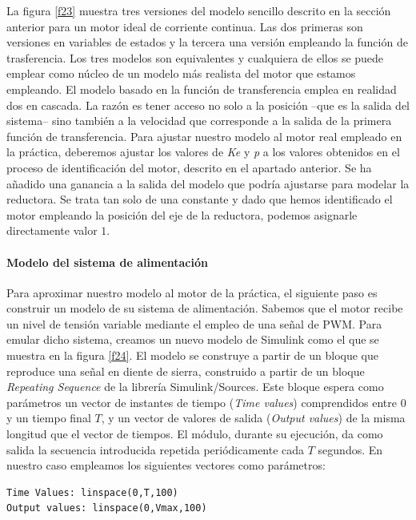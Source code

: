 \documentclass[10pt,a4paper]{report}
\begin{document}
La figura \ref{f23} muestra tres versiones del modelo sencillo descrito en la sección anterior para un motor ideal de corriente continua. Las dos primeras son  versiones en variables de estados y la tercera una versión empleando la función de trasferencia. Los tres modelos son equivalentes y cualquiera de ellos se puede emplear como núcleo de un modelo más realista del motor que estamos empleando. El modelo basado en la función de transferencia emplea en realidad dos en cascada. La razón es tener acceso no solo a la posición --que es la salida del sistema-- sino también a la velocidad que corresponde a la salida de la primera función de transferencia. Para ajustar nuestro modelo al motor real empleado en la práctica, deberemos ajustar los valores de \emph{Ke} y \emph{p} a los valores obtenidos en el proceso de identificación del motor, descrito en el apartado anterior. Se ha añadido una ganancia a la salida del modelo que podría ajustarse para modelar la reductora. Se trata tan solo de una constante y dado que hemos identificado el motor empleando la posición del eje de la reductora, podemos asignarle directamente valor $1$. 

\paragraph{Modelo del sistema de alimentación} Para aproximar nuestro modelo al motor de la práctica, el siguiente paso es construir un modelo de su sistema de alimentación. Sabemos que el motor recibe un nivel de tensión variable mediante el empleo de una señal de PWM. Para emular dicho sistema, creamos un nuevo modelo de Simulink como el que se muestra en la figura \ref{f24}. El modelo se construye a partir de un bloque que reproduce una señal en diente de sierra, construido a partir de un bloque \emph{Repeating Sequence} de la librería Simulink/Sources. Este bloque espera como parámetros un vector de instantes de tiempo (\emph{Time values}) comprendidos entre $0$ y un tiempo final $T$, y un vector de valores de salida (\emph{Output values}) de la misma longitud que el vector de tiempos. El módulo, durante su ejecución, da como salida la secuencia introducida repetida periódicamente cada $T$ segundos. En nuestro caso empleamos los siguientes vectores como parámetros:
\begin{verbatim}
Time Values: linspace(0,T,100)
Output values: linspace(0,Vmax,100)
\end{verbatim}
\end{document}
